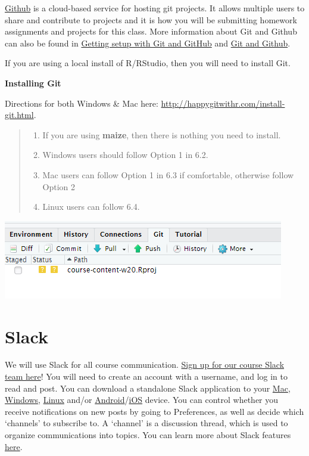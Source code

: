 \documentclass[
]{book}
\providecommand{\tightlist}{%
  \setlength{\itemsep}{0pt}\setlength{\parskip}{0pt}}
\begin{document}
\href{https://happygitwithr.com/big-picture.html\#why-github}{Github} is a
cloud-based service for hosting git projects. It allows multiple users
to share and contribute to projects and it is how you will be submitting
homework assignments and projects for this class. More information about Git and
Github can also be found in \href{https://rfortherestofus.com/2021/02/how-to-use-git-github-with-r/}{Getting setup with Git and
GitHub} and \href{https://sahirbhatnagar.com/rpkg/\#gitgithub}{Git and Github}.

If you are using a local install of R/RStudio, then you will need to
install Git.

\textbf{Installing Git}

Directions for both Windows \& Mac here:
\url{http://happygitwithr.com/install-git.html}.

\begin{quote}
\begin{enumerate}
\def\labelenumi{\arabic{enumi}.}
\tightlist
\item
  If you are using \textbf{maize}, then there is nothing you need to install.
\item
  Windows users should follow Option 1 in 6.2.
\item
  Mac users can follow Option 1 in 6.3 if comfortable, otherwise follow Option 2
\item
  Linux users can follow 6.4.
\end{enumerate}
\end{quote}

\includegraphics{img/maize_gittab.png}

\hypertarget{slack}{%
\section{Slack}\label{slack}}

We will use Slack for all course communication. \href{https://join.slack.com/t/datasciencewinter24/shared_invite/zt-2a2xv06eo-csIThOBrnJ_UY~jImBiUoQ}{Sign up for our course
Slack team
here}!
You will need to create an account with a username, and log in to read
and post. You can download a
standalone Slack application to your
\href{https://slack.com/downloads/osx}{Mac},
\href{https://slack.com/downloads/windows}{Windows},
\href{https://slack.com/downloads/linux}{Linux} and/or
\href{https://slack.com/downloads/android}{Android}/\href{https://slack.com/downloads/ios}{iOS}
device. You can control whether you receive notifications on new posts
by going to Preferences, as well as decide which `channels' to subscribe
to. A `channel' is a discussion thread, which is used to organize
communications into topics. You can learn more about Slack features
\href{https://slack.com/help/articles/218080037-Getting-started-for-new-Slack-users}{here}.
\end{document}

